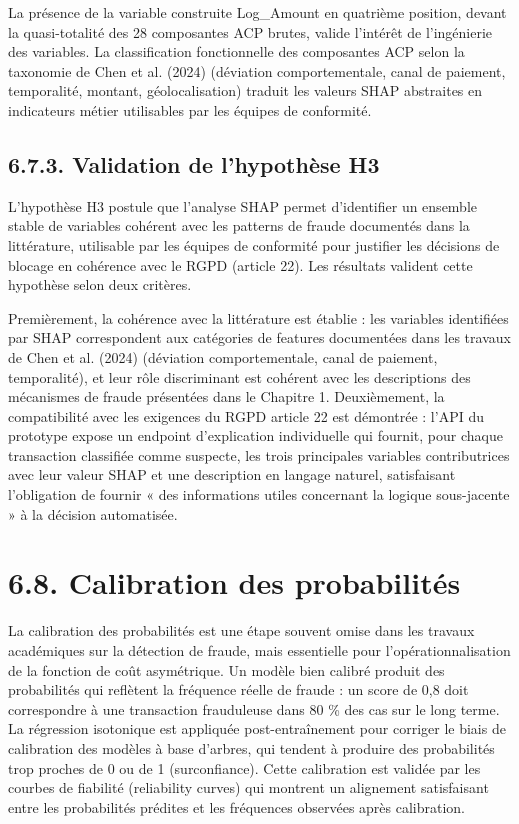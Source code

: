 La présence de la variable construite Log\_Amount en quatrième position, devant la quasi-totalité des 28 composantes ACP brutes, valide l'intérêt de l'ingénierie des variables. La classification fonctionnelle des composantes ACP selon la taxonomie de Chen et al. (2024) (déviation comportementale, canal de paiement, temporalité, montant, géolocalisation) traduit les valeurs SHAP abstraites en indicateurs métier utilisables par les équipes de conformité.

\subsection{6.7.3. Validation de l'hypothèse H3}

L'hypothèse H3 postule que l'analyse SHAP permet d'identifier un ensemble stable de variables cohérent avec les patterns de fraude documentés dans la littérature, utilisable par les équipes de conformité pour justifier les décisions de blocage en cohérence avec le RGPD (article 22). Les résultats valident cette hypothèse selon deux critères.

Premièrement, la cohérence avec la littérature est établie : les variables identifiées par SHAP correspondent aux catégories de features documentées dans les travaux de Chen et al. (2024) (déviation comportementale, canal de paiement, temporalité), et leur rôle discriminant est cohérent avec les descriptions des mécanismes de fraude présentées dans le Chapitre 1. Deuxièmement, la compatibilité avec les exigences du RGPD article 22 est démontrée : l'API du prototype expose un endpoint d'explication individuelle qui fournit, pour chaque transaction classifiée comme suspecte, les trois principales variables contributrices avec leur valeur SHAP et une description en langage naturel, satisfaisant l'obligation de fournir « des informations utiles concernant la logique sous-jacente » à la décision automatisée.

\section{6.8. Calibration des probabilités}

La calibration des probabilités est une étape souvent omise dans les travaux académiques sur la détection de fraude, mais essentielle pour l'opérationnalisation de la fonction de coût asymétrique. Un modèle bien calibré produit des probabilités qui reflètent la fréquence réelle de fraude : un score de 0,8 doit correspondre à une transaction frauduleuse dans 80 \% des cas sur le long terme. La régression isotonique est appliquée post-entraînement pour corriger le biais de calibration des modèles à base d'arbres, qui tendent à produire des probabilités trop proches de 0 ou de 1 (surconfiance). Cette calibration est validée par les courbes de fiabilité (reliability curves) qui montrent un alignement satisfaisant entre les probabilités prédites et les fréquences observées après calibration.

